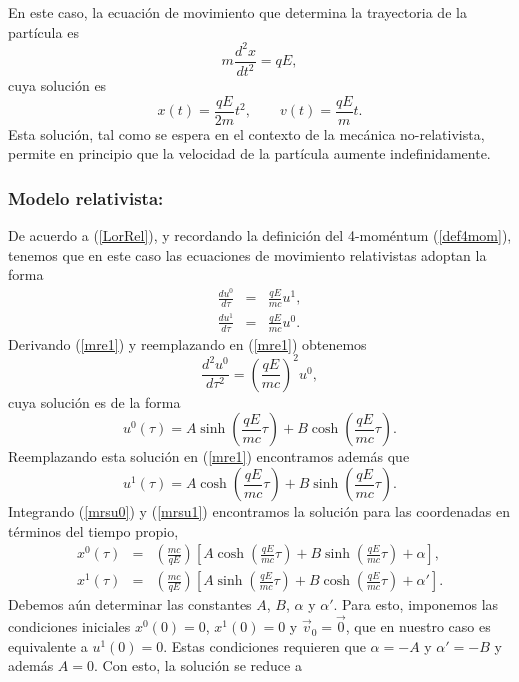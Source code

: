 En este caso, la ecuación de movimiento que determina la trayectoria de la
partícula es
\begin{equation}
m\frac{d^2x}{dt^2}=qE,
\end{equation}
cuya solución es
\begin{equation}
x(t)=\frac{qE}{2m}t^2, \qquad v(t)=\frac{qE}{m}t.
\end{equation}
Esta solución, tal como se espera en el contexto de la mecánica
no-relativista, permite en principio que la velocidad de la partícula aumente
indefinidamente.

\subsubsection{Modelo relativista:}

De acuerdo a (\ref{LorRel}), y recordando la definición del 4-moméntum (\ref{def4mom}), tenemos que en este caso las ecuaciones de movimiento relativistas adoptan la forma
\begin{eqnarray}
\frac{du^0}{d\tau}&=& \frac{qE}{mc} u^1, \label{mre1} \\
\frac{du^1}{d\tau}&=&\frac{qE}{mc} u^0.\label{mre2}
\end{eqnarray}
Derivando (\ref{mre1}) y reemplazando en (\ref{mre1}) obtenemos
\begin{equation}
 \frac{d^2u^0}{d\tau^2}=\left( \frac{qE}{mc}\right)^2 u^0,
\end{equation}
cuya solución es de la forma
\begin{equation}
u^0(\tau)=A\sinh\left( \frac{qE}{mc}\tau\right)+B\cosh\left(
\frac{qE}{mc}\tau\right). \label{mrsu0}
\end{equation}
Reemplazando esta solución en (\ref{mre1}) encontramos además que
\begin{equation}
u^1(\tau)=A\cosh\left( \frac{qE}{mc}\tau\right)+B\sinh\left(
\frac{qE}{mc}\tau\right). \label{mrsu1}
\end{equation}
Integrando (\ref{mrsu0}) y (\ref{mrsu1}) encontramos la solución para las coordenadas en términos del tiempo propio,
\begin{eqnarray}
x^0(\tau)&=&\left(\frac{mc}{qE}\right)\left[A\cosh\left( \frac{qE}{mc}\tau\right)+B\sinh\left(
\frac{qE}{mc}\tau\right)+\alpha\right] ,\\
x^1(\tau)&=&\left(\frac{mc}{qE}\right)\left[A\sinh\left( \frac{qE}{mc}\tau\right)+B\cosh\left(
\frac{qE}{mc}\tau\right)+\alpha'\right] .
\end{eqnarray}
Debemos aún determinar las constantes $A$, $B$, $\alpha$ y $\alpha'$. Para esto, imponemos las condiciones iniciales $x^0(0)=0$, $x^1(0)=0$ y $\vec{v}_0=\vec{0}$, que en nuestro caso es equivalente a $u^1(0)=0$. Estas condiciones requieren que $\alpha=-A$ y $\alpha'=-B$ y además $A=0$. Con esto, la solución se reduce a
